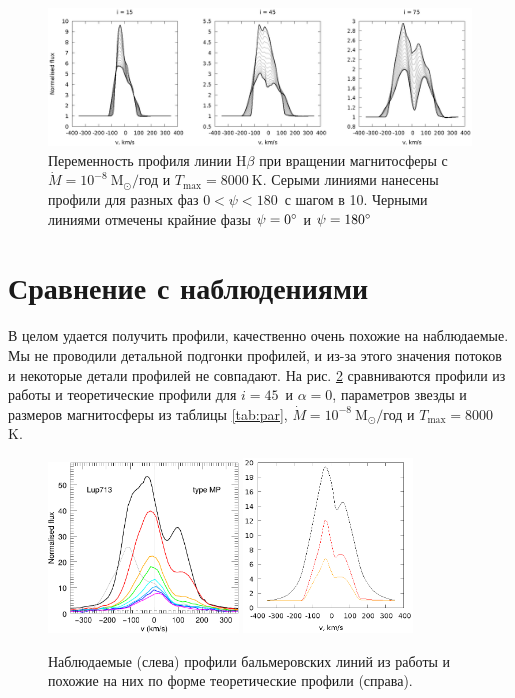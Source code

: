 \documentclass[12pt]{article}
\begin{document}
\begin{figure}[h]
\centering
\includegraphics[width=\textwidth]{rot_8.eps}
\caption{Переменность профиля линии H$\beta$ при вращении магнитосферы с $\dot{M} = 10^{-8}\ \text{M}_\odot/$год и $T_\text{max} = 8000\ \text{K}$. Серыми линиями нанесены профили для разных фаз $0$\degree$< \psi < 180$\degree\ с шагом в 10\degree. Черными линиями отмечены крайние фазы $\psi = 0\text{\degree}$ и $\psi = 180\text{\degree}$}
\label{fig:rot8}
\end{figure}

\FloatBarrier

\section{Сравнение с наблюдениями}

В целом удается получить профили, качественно очень похожие на наблюдаемые. Мы не проводили детальной подгонки профилей, и из-за этого значения потоков и некоторые детали профилей не совпадают. На рис. \ref{fig:compprof} сравниваются профили из работы \cite{antoniucci17} и теоретические профили для $i = 45$\degree\ и $\alpha = 0$\degree, параметров звезды и размеров магнитосферы из таблицы \ref{tab:par}, $\dot{M} = 10^{-8}\ \text{M}_\odot/$год и $T_\text{max} = 8000$ K. 

\begin{figure}[h]
\centering
\includegraphics[width=0.45\textwidth]{profiles2.png}
\includegraphics[width=0.4\textwidth]{lookslike45.eps}
\caption{Наблюдаемые (слева) профили бальмеровских линий из работы \cite{antoniucci17} и похожие на них по форме теоретические профили (справа).}
\label{fig:compprof}
\end{figure} 
\end{document}
